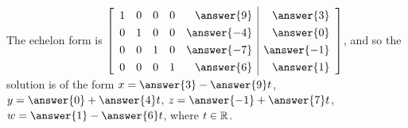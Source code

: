 \documentclass{ximera}
\begin{document}
\begin{exercise}
\begin{enumerate}
        The echelon form is 
        $\def\arraystretch{1.3}
        \startmat{rrrrr|r}
        1 & 0 & 0 & 0 & \answer{9} & \answer{3} \\
        0 & 1 & 0 & 0 & \answer{-4} & \answer{0} \\
        0 & 0 & 1 & 0 & \answer{-7} & \answer{-1} \\
        0 & 0 & 0 & 1 & \answer{6} & \answer{1}
        \stopmat$, and so the solution is of the form $x=\answer{3}-\answer{9}t$, $y=\answer{0}+\answer{4}t$, $z=\answer{-1}+\answer{7}t$, $w=\answer{1}-\answer{6}t$, where $t\in \mathbb{R}$.
        
    \end{enumerate}
    

\end{exercise}
\end{document}
